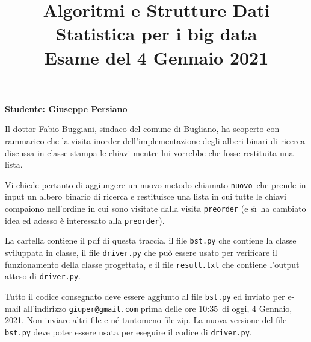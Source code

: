 \documentclass{amsart}
\begin{document}
\title{Algoritmi e Strutture Dati\\
Statistica per i big data\\
Esame del 4 Gennaio 2021
}


\newcommand{\NomeStudente}{Giuseppe Persiano}
\newcommand{\nomeClasse}{{\tt{Sol}}}
\newcommand{\nomeMetodo}{{\tt{nuovo}}}
\newcommand{\oraconsegna}{10:35}
\newcommand{\dataoggi}{4 Gennaio, 2021}


\maketitle

\hfill{{\bf Studente: \NomeStudente}}

\smallskip
Il dottor Fabio Buggiani, sindaco del comune di Bugliano,
ha scoperto con rammarico che la visita inorder dell'implementazione
degli alberi binari di ricerca discussa in classe
stampa le chiavi mentre lui vorrebbe che fosse 
restituita una lista.

Vi chiede pertanto di aggiungere un nuovo metodo chiamato \nomeMetodo\
che prende in input un albero binario di ricerca e restituisce una lista
in cui tutte le chiavi compaiono nell'ordine in cui sono visitate
dalla visita {\tt preorder} (e s\`\i\ ha cambiato idea ed adesso \`e interessato alla {\tt preorder}).

\medskip{}
La cartella contiene il pdf di questa traccia, il file
{\tt bst.py} che contiene la classe sviluppata in classe,
il file {\tt driver.py} che pu\`o essere usato
per verificare il funzionamento della classe progettata, e il file  {\tt result.txt} che contiene
l'output atteso di {\tt driver.py}.

\medskip{}
Tutto il codice consegnato deve essere aggiunto al file
{\tt bst.py} ed inviato per e-mail all'indirizzo
{\tt giuper@gmail.com} prima delle ore \oraconsegna\ di oggi, 
\dataoggi. Non inviare altri file e n\'e tantomeno file zip.
La nuova versione del file {\tt bst.py} deve poter essere usata per eseguire
il codice di {\tt driver.py}. 
\end{document}
